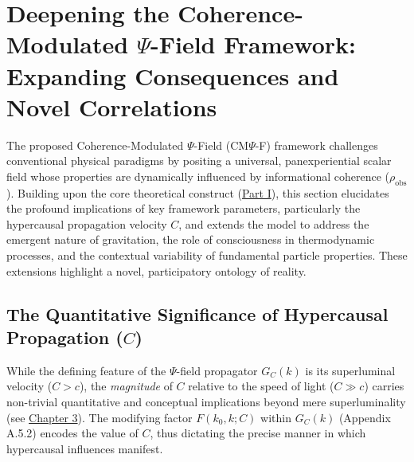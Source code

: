 
\section{Deepening the Coherence-Modulated $\Psi$-Field Framework: Expanding Consequences and Novel Correlations}
\label{sec:deep-implications}

The proposed Coherence-Modulated $\Psi$-Field (CM$\Psi$-F) framework challenges conventional physical paradigms by positing a universal, panexperiential scalar field whose properties are dynamically influenced by informational coherence ($\rho_{\text{obs}}$). Building upon the core theoretical construct (\hyperref[chap:proposal]{Part I}), this section elucidates the profound implications of key framework parameters, particularly the hypercausal propagation velocity $C$, and extends the model to address the emergent nature of gravitation, the role of consciousness in thermodynamic processes, and the contextual variability of fundamental particle properties. These extensions highlight a novel, participatory ontology of reality.

\subsection{The Quantitative Significance of Hypercausal Propagation ($C$)}
\label{subsec:C-magnitude}

While the defining feature of the $\Psi$-field propagator $G_C(k)$ is its superluminal velocity ($C > c$), the \emph{magnitude} of $C$ relative to the speed of light ($C \gg c$) carries non-trivial quantitative and conceptual implications beyond mere superluminality (see \hyperref[chap:hypercausal]{Chapter 3}). The modifying factor $F(k_0, k; C)$ within $G_C(k)$ (Appendix A.5.2) encodes the value of $C$, thus dictating the precise manner in which hypercausal influences manifest.

